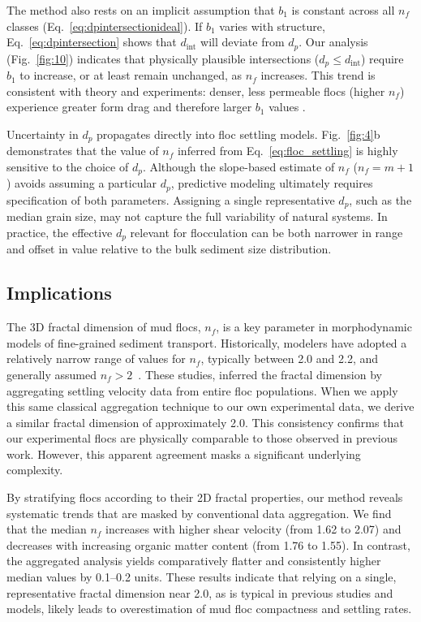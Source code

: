 \documentclass{agujournal2019}
\begin{document}
The method also rests on an implicit assumption that $b_1$ is constant across all $n_f$ classes (Eq.~\eqref{eq:dpintersectionideal}).  If $b_1$ varies with structure, Eq.~\eqref{eq:dpintersection} shows that $d_{\text{int}}$ will deviate from $d_p$.  Our analysis (Fig.~\ref{fig:10}) indicates that physically plausible intersections ($d_p \le d_{\text{int}}$) require $b_1$ to increase, or at least remain unchanged, as $n_f$ increases.  This trend is consistent with theory and experiments: denser, less permeable flocs (higher $n_f$) experience greater form drag and therefore larger $b_1$ values \cite{strom2011explicit}.

Uncertainty in $d_p$ propagates directly into floc settling models. Fig.~\ref{fig:4}b demonstrates that the value of $n_f$ inferred from Eq.~\eqref{eq:floc_settling} is highly sensitive to the choice of $d_p$. Although the slope-based estimate of $n_f$ ($n_f = m + 1$) avoids assuming a particular $d_p$, predictive modeling ultimately requires specification of both parameters. Assigning a single representative $d_p$, such as the median grain size, may not capture the full variability of natural systems. In practice, the effective $d_p$ relevant for flocculation can be both narrower in range and offset in value relative to the bulk sediment size distribution.

\subsection{Implications}

The 3D fractal dimension of mud flocs, $n_f$, is a key parameter in morphodynamic models of fine-grained sediment transport. Historically, modelers have adopted a relatively narrow range of values for $n_f$, typically between 2.0 and 2.2, and generally assumed $n_f > 2$~\cite{kranenburg1994fractal, son2008flocculation, winterwerp1998simple, winterwerp2004introduction, winterwerp2006heuristic}. These studies, inferred the fractal dimension by aggregating settling velocity data from entire floc populations. When we apply this same classical aggregation technique to our own experimental data, we derive a similar fractal dimension of approximately 2.0. This consistency confirms that our experimental flocs are physically comparable to those observed in previous work. However, this apparent agreement masks a significant underlying complexity.

By stratifying flocs according to their 2D fractal properties, our method reveals systematic trends that are masked by conventional data aggregation. We find that the median $n_f$ increases with higher shear velocity (from 1.62 to 2.07) and decreases with increasing organic matter content (from 1.76 to 1.55). In contrast, the aggregated analysis yields comparatively flatter and consistently higher median values by 0.1--0.2 units. These results indicate that relying on a single, representative fractal dimension near 2.0, as is typical in previous studies and models, likely leads to overestimation of mud floc compactness and settling rates.
\end{document}
